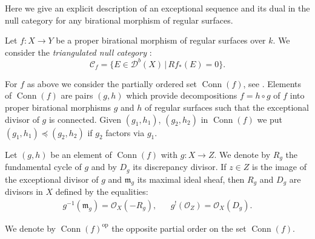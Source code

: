 \documentclass[12pt,a4paper]{amsart}
\newcommand{\f}{\varphi}
\newcommand{\cC}{{\mathcal{C}}}
\newcommand{\dD}{{\mathcal{D}}}
\newcommand{\oO}{{\mathcal{O}}}
\newcommand{\Conn}{\mathop{\textrm{Conn}}\nolimits}
\newcommand{\opp}{\mathop{\textrm{op}}\nolimits}
\theoremstyle{definition}
\begin{document}

Here we give an explicit description of an exceptional sequence and its dual in the null category for any birational morphism of regular surfaces.


Let $f\colon X\to Y$ be a  proper birational morphism of regular surfaces over $k$. We consider the \emph{triangulated null category} \cite{BodBon2}:
$$
\cC_f = \{E \in \dD^b(X)\,|\, Rf_*(E) =0\}.
$$

For $f$ as above we consider the partially ordered set $\Conn(f)$, see  \cite{BodBon2}. Elements of $\Conn(f)$ are pairs $(g,h)$ which provide decompositions $f = h \circ g$ of $f$ into proper birational morphisms $g$ and $h$ of regular surfaces such that the exceptional divisor of $g$ is connected. Given $(g_1,h_1)$, $(g_2, h_2)$ in $\Conn(f)$ we put $(g_1, h_1) \preceq (g_2, h_2)$ if $g_2$ factors via $g_1$.

Let $(g,h)$ be an element of $\Conn(f)$ with $g\colon X\to Z$. We denote by $R_g$ the fundamental cycle of $g$ and by $D_g$ its discrepancy divisor. If $z\in Z$ is the image of the exceptional divisor of $g$ and $\mathfrak{m}_g$ its maximal ideal sheaf, then $R_g$ and $D_g$ are divisors in $X$ defined by the equalities: 
\begin{align*}
&g^{-1}(\mathfrak{m}_g) = \oO_X(-R_g),& & g^!(\oO_Z) = \oO_X(D_g).&
\end{align*}

We denote by $\Conn(f)^{\opp}$ the opposite partial order on the set $\Conn(f)$.

\end{document}
